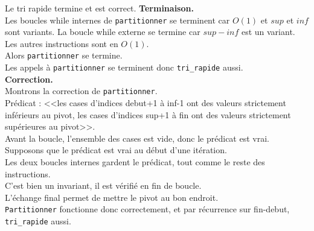\documentclass[french, 11pt]{article}
\begin{document}
\begin{prop}{}{}
    Le tri rapide termine et est correct.
    \tcblower
    \textbf{Terminaison.}\\
    Les boucles while internes de \texttt{partitionner} se terminent car $O(1)$ et $sup$ et $inf$ sont variants.
    La boucle while externe se termine car $sup - inf$ est un variant.
    Les autres instructions sont en $O(1)$.\\
    Alors \texttt{partitionner} se termine.\\
    Les appels à \texttt{partitionner} se terminent donc \texttt{tri\_rapide} aussi.\\
    \textbf{Correction.}\\
    Montrons la correction de \texttt{partitionner}.\\
    Prédicat : <<les cases d'indices debut+1 à inf-1 ont des valeurs strictement inférieurs au pivot, les cases d'indices sup+1 à fin ont des valeurs strictement supérieures au pivot>>.\\
    Avant la boucle, l'ensemble des cases est vide, donc le prédicat est vrai.\\
    Supposons que le prédicat est vrai au début d'une itération.\\
    Les deux boucles internes gardent le prédicat, tout comme le reste des instructions.\\
    C'est bien un invariant, il est vérifié en fin de boucle.\\
    L'échange final permet de mettre le pivot au bon endroit.\\
    \texttt{Partitionner} fonctionne donc correctement, et par récurrence sur fin-debut, \texttt{tri\_rapide} aussi.
\end{prop}
\end{document}
